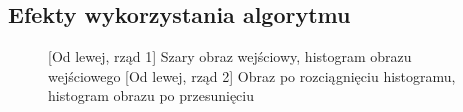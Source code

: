 \documentclass[a4paper,12pt, titlepage]{report}
\begin{document}
\subsection*{Efekty wykorzystania algorytmu}
\begin{figure}[h]
    \centering
    \qquad
    \caption{[Od lewej, rząd 1] Szary obraz wejściowy, histogram obrazu wejściowego [Od lewej, rząd 2] Obraz po rozciągnięciu histogramu, histogram obrazu po przesunięciu}%
    \label{fig:geo_after_grey1}%
\end{figure}
\end{document}
